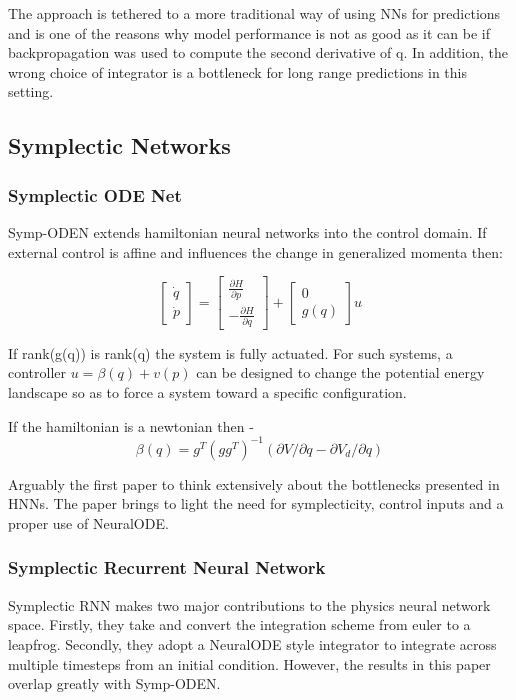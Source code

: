 \documentclass{article}
\begin{document}
The approach is tethered to a more traditional way of using NNs for predictions and is one of the reasons why model performance is not as good as it can be if backpropagation was used to compute the second derivative of q. In addition, the wrong choice of integrator is a bottleneck for long range predictions in this setting.

\subsection{Symplectic Networks}
\subsubsection{Symplectic ODE Net}

Symp-ODEN \cite{zhong_symplectic_2019} extends hamiltonian neural networks into the control domain. If external control is affine and influences the change in generalized momenta then:

$$ 
\begin{bmatrix}
\dot{q} \\
\dot{p}
\end{bmatrix}
= 
\begin{bmatrix}
\frac{\partial H}{\partial p} \\
-\frac{\partial H}{\partial q}
\end{bmatrix}
+
\begin{bmatrix}
0 \\
g(q)
\end{bmatrix} u
$$

If rank(g(q)) is rank(q) the system is fully actuated. For such systems, a controller $u = \beta(q) +v(p) $ can be designed to change the potential energy landscape so as to force a system toward a specific configuration.

If the hamiltonian is a newtonian then - $$ \beta(q) = g^T (gg^T)^{-1} (\partial V/\partial q - \partial V_d/\partial q) $$

Arguably the first paper to think extensively about the bottlenecks presented in HNNs. The paper brings to light the need for symplecticity, control inputs and a proper use of NeuralODE. 



\subsubsection{Symplectic Recurrent Neural Network}

Symplectic RNN \cite{chen_symplectic_2020} makes two major contributions to the physics neural network space. Firstly, they take  and convert the integration scheme from euler to a leapfrog. Secondly, they adopt a NeuralODE style integrator to integrate across multiple timesteps from an initial condition. However, the results in this paper overlap greatly with Symp-ODEN. 
\end{document}

